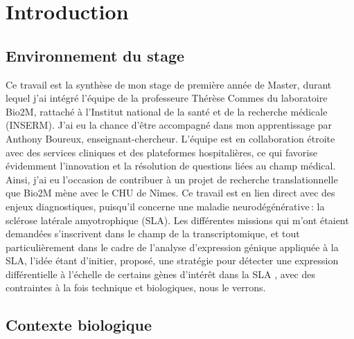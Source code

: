 \section{Introduction}

	

\subsection{Environnement du stage}

Ce travail est la synthèse de mon stage de première année de Master, durant lequel j'ai intégré l'équipe de la professeure Thérèse Commes du laboratoire Bio2M,
 rattaché à l’Institut national de la santé et de la recherche médicale (INSERM). J'ai eu la chance d'être accompagné dans mon apprentissage par Anthony Boureux, enseignant-chercheur.
L'équipe est en collaboration étroite avec des services cliniques et des plateformes hospitalières, ce qui favorise évidemment l’innovation et la résolution de questions liées au champ médical.
Ainsi, j'ai eu l’occasion de contribuer à un projet de recherche translationnelle que Bio2M mène avec le CHU de Nîmes.  Ce travail est en lien direct avec des enjeux diagnostiques, puisqu’il concerne une maladie neurodégénérative : la sclérose latérale amyotrophique (SLA).
Les différentes missions qui m'ont étaient demandées s’inscrivent dans le champ de la transcriptomique, et tout particulièrement dans le cadre de l’analyse d’expression génique appliquée à la SLA, 
l’idée étant d’initier, proposé, une stratégie pour détecter une expression différentielle à l’échelle de certains gènes d’intérêt dans la SLA , avec des contraintes à la fois technique et biologiques,
 nous le verrons.

\subsection{Contexte biologique}

